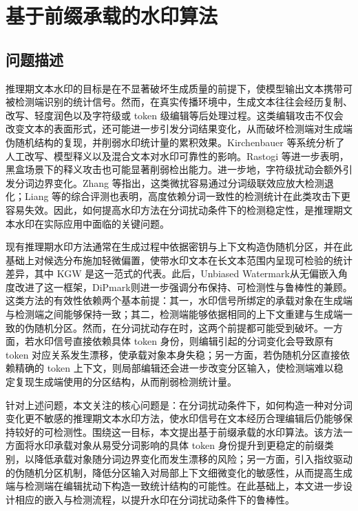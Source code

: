 \chapter{基于前缀承载的水印算法}

\section{问题描述}

推理期文本水印的目标是在不显著破坏生成质量的前提下，使模型输出文本携带可被检测端识别的统计信号。然而，在真实传播环境中，生成文本往往会经历复制、改写、轻度润色以及字符级或 token 级编辑等后处理过程。这类编辑攻击不仅会改变文本的表面形式，还可能进一步引发分词结果变化，从而破坏检测端对生成端伪随机结构的复现，并削弱水印统计量的累积效果。Kirchenbauer 等\cite{kirchenbauer2024reliability}系统分析了人工改写、模型释义以及混合文本对水印可靠性的影响。Rastogi 等\cite{rastogi2024revisiting}进一步表明，黑盒场景下的释义攻击也可能显著削弱检出能力。进一步地，字符级扰动会额外引发分词边界变化。Zhang 等\cite{zhang2025character}指出，这类微扰容易通过分词级联效应放大检测退化；Liang 等\cite{liang2024waterpark}的综合评测也表明，高度依赖分词一致性的检测统计在此类攻击下更容易失效。因此，如何提高水印方法在分词扰动条件下的检测稳定性，是推理期文本水印在实际应用中面临的关键问题。

现有推理期水印方法通常在生成过程中依据密钥与上下文构造伪随机分区，并在此基础上对候选分布施加轻微偏置，使带水印文本在长文本范围内呈现可检验的统计差异，其中 KGW\cite{kirchenbauer2023watermark} 是这一范式的代表。此后，Unbiased Watermark\cite{hu2023unbiased}从无偏嵌入角度改进了这一框架，DiPmark\cite{wu2023dipmark}则进一步强调分布保持、可检测性与鲁棒性的兼顾。这类方法的有效性依赖两个基本前提：其一，水印信号所绑定的承载对象在生成端与检测端之间能够保持一致；其二，检测端能够依据相同的上下文重建与生成端一致的伪随机分区。然而，在分词扰动存在时，这两个前提都可能受到破坏。一方面，若水印信号直接依赖具体 token 身份，则编辑引起的分词变化会导致原有 token 对应关系发生漂移，使承载对象本身失稳；另一方面，若伪随机分区直接依赖精确的 token 上下文，则局部编辑还会进一步改变分区输入，使检测端难以稳定复现生成端使用的分区结构，从而削弱检测统计量。

针对上述问题，本文关注的核心问题是：在分词扰动条件下，如何构造一种对分词变化更不敏感的推理期文本水印方法，使水印信号在文本经历合理编辑后仍能够保持较好的可检测性。围绕这一目标，本文提出基于前缀承载的水印算法。该方法一方面将水印承载对象从易受分词影响的具体 token 身份提升到更稳定的前缀类别，以降低承载对象随分词边界变化而发生漂移的风险；另一方面，引入指纹驱动的伪随机分区机制，降低分区输入对局部上下文细微变化的敏感性，从而提高生成端与检测端在编辑扰动下构造一致统计结构的可能性。在此基础上，本文进一步设计相应的嵌入与检测流程，以提升水印在分词扰动条件下的鲁棒性。

